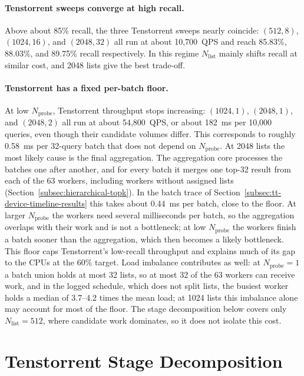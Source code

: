 \paragraph{Tenstorrent sweeps converge at high recall.}
Above about 85\% recall, the three Tenstorrent sweeps nearly coincide:
\((512,8)\), \((1024,16)\), and \((2048,32)\) all run at about 10,700~QPS and
reach 85.83\%, 88.03\%, and 89.75\% recall respectively. In this regime
\(N_{\mathrm{list}}\) mainly shifts recall at similar cost, and 2048 lists give
the best trade-off.

\paragraph{Tenstorrent has a fixed per-batch floor.}
At low \(N_{\mathrm{probe}}\), Tenstorrent throughput stops increasing:
\((1024,1)\), \((2048,1)\), and \((2048,2)\) all run at about 54,800~QPS, or
about 182~ms per 10,000 queries, even though their candidate volumes differ.
This corresponds to roughly 0.58~ms per 32-query batch that does not depend on
\(N_{\mathrm{probe}}\). At 2048 lists the most likely cause is the final
aggregation. The
aggregation core processes the batches one after another, and for every batch
it merges one top-32 result from each of the 63 workers, including workers
without assigned lists (Section~\ref{subsec:hierarchical-topk}). In the batch
trace of Section~\ref{subsec:tt-device-timeline-results} this takes about
0.44~ms per batch, close to the floor. At larger \(N_{\mathrm{probe}}\) the
workers need several milliseconds per batch, so the aggregation overlaps with
their work and is not a bottleneck; at low \(N_{\mathrm{probe}}\) the workers
finish a batch sooner than the aggregation, which then becomes a likely
bottleneck. This floor caps Tenstorrent's low-recall throughput and explains
much of its gap to the CPUs at the 60\% target. Load imbalance contributes as
well: at \(N_{\mathrm{probe}}=1\) a batch union holds at most 32 lists, so at
most 32 of the 63 workers can receive work, and in the logged schedule, which
does not split lists, the busiest worker holds a median of 3.7--4.2 times the
mean load; at 1024 lists this imbalance alone may account for most of the
floor. The stage decomposition below covers only
\(N_{\mathrm{list}}=512\), where candidate work dominates, so it does not
isolate this cost.

\section{Tenstorrent Stage Decomposition}
\label{sec:tt-stage-results}

